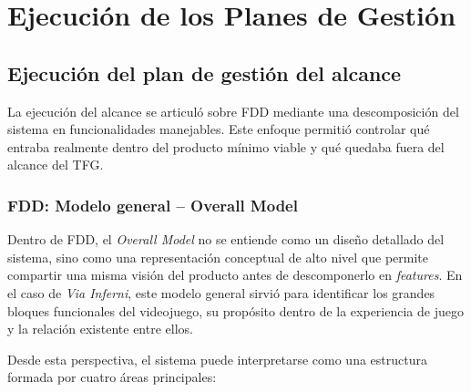 \chapter{Ejecución de los Planes de Gestión}

\begin{abstract}
Este capítulo describe cómo los planes de gestión definidos previamente se trasladaron a
la ejecución real del proyecto.
\end{abstract}

\section{Ejecución del plan de gestión del alcance}
La ejecución del alcance se articuló sobre FDD mediante una descomposición del sistema en
funcionalidades manejables. Este enfoque permitió controlar qué entraba realmente dentro
del producto mínimo viable y qué quedaba fuera del alcance del TFG.

\subsection{FDD: Modelo general -- Overall Model}
Dentro de FDD, el \textit{Overall Model} no se entiende como un diseño detallado del
sistema, sino como una representación conceptual de alto nivel que permite compartir una
misma visión del producto antes de descomponerlo en \textit{features}. En el caso de
\textit{Via Inferni}, este modelo general sirvió para identificar los grandes bloques
funcionales del videojuego, su propósito dentro de la experiencia de juego y la relación
existente entre ellos.

Desde esta perspectiva, el sistema puede interpretarse como una estructura formada por
cuatro áreas principales:

